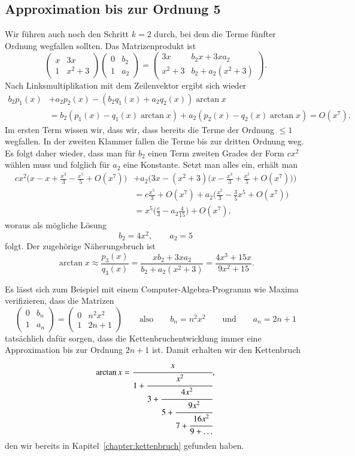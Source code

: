\begin{refsection}
\subsection{Approximation bis zur Ordnung 5}
Wir führen auch noch den Schritt $k=2$ durch, bei dem die Terme fünfter
Ordnung wegfallen sollten.
Das Matrizenprodukt ist
\[
\begin{pmatrix}
x&3x\\
1&x^2+3
\end{pmatrix}
\begin{pmatrix}
0&b_2\\
1&a_2
\end{pmatrix}
=
\begin{pmatrix}
3x    & b_2x + 3xa_2 \\
x^2+3 & b_2 + a_2(x^2+3)
\end{pmatrix}.
\]
Nach Linksmultiplikation mit dem Zeilenvektor ergibt sich wieder
\begin{align*}
b_2p_1(x) &+ a_2p_2(x) - (b_2q_1(x)+a_2q_2(x))
\arctan x
\\
&=
b_2(p_1(x)-q_1(x) \arctan x)
+ a_2(p_2(x) - q_2(x)\arctan x)
=
O(x^7).
\end{align*}
Im ersten Term wissen wir, dass wir, dass bereits die Terme der
Ordnung $\le 1$ wegfallen.
In der zweiten Klammer fallen die Terme bis zur dritten Ordnung weg.
Es folgt daher wieder, dass man für $b_2$ einen Term zweiten Grades
der Form $cx^2$ wählen muss und folglich für $a_2$ eine Konstante.
Setzt man alles ein, erhält man
\begin{align*}
cx^2\biggl(x- x+\frac{x^3}3-\frac{x^5}5+O(x^7)\biggr)
&+
a_2\biggl(3x -(x^2+3)\biggl(x-\frac{x^3}3+\frac{x^5}5+O(x^7)\biggr)\biggr)
\\
&=
c\frac{x^5}{3}
+O(x^7)
+a_2
\biggl(\frac{x^5}{3}-\frac{3}{5}x^5+O(x^7)\biggr)
\\
&=x^5\biggl(\frac{c}3-a_2\frac{4}{15}\biggr) + O(x^7),
\end{align*}
woraus als mögliche Lösung
\[
b_2=4x^2,\qquad
a_2=5
\]
folgt.
Der zugehörige Näherungsbruch ist
\[
\arctan x
\approx
\frac{p_3(x)}{q_3(x)}
=
\frac{xb_2+3xa_2}{b_2+a_2(x^2+3)}
=
\frac{4x^3+15x}{9x^2+15}.
\]

Es lässt sich zum Beispiel mit einem Computer-Algebra-Programm wie
Maxima verifizieren, dass die Matrizen
\begin{equation}
\begin{pmatrix}
0&b_n\\
1&a_n
\end{pmatrix}
=
\begin{pmatrix}
0&n^2x^2\\
1&2n+1
\end{pmatrix}
\qquad\text{also}\qquad
b_n=n^2x^2\qquad\text{und}\qquad a_n=2n+1
\label{arctan:increment}
\end{equation}
tatsächlich dafür sorgen, dass die Kettenbruchentwicklung 
immer eine Approximation bis zur Ordnung $2n+1$ ist.
Damit erhalten wir den Kettenbruch
\[
\arctan x
=
\cfrac{x}{
1+\cfrac{x^2}{
3+\cfrac{4x^2}{
5+\cfrac{9x^2}{
7+\cfrac{16x^2}{
9+\dots
}}}}},
\]
den wir bereits in Kapitel~\ref{chapter:kettenbruch} gefunden haben.


\end{refsection}
